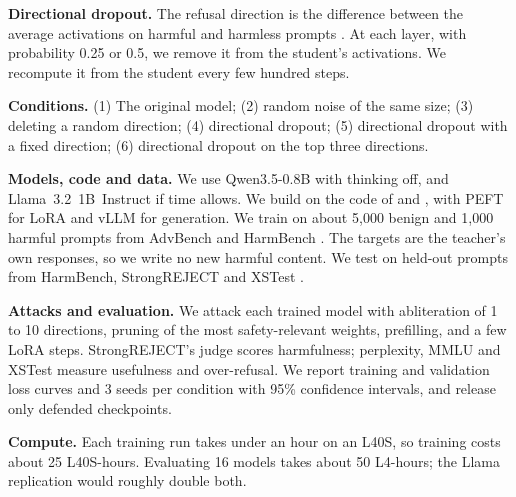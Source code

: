 \documentclass[12pt]{article}
\begin{document}
\textbf{Directional dropout.}
The refusal direction is the difference between the average activations on harmful and harmless prompts \citep{arditi2024refusal}.
At each layer, with probability 0.25 or 0.5, we remove it from the student's activations.
We recompute it from the student every few hundred steps.

\textbf{Conditions.}
(1) The original model; (2) random noise of the same size; (3) deleting a random direction; (4) directional dropout; (5) directional dropout with a fixed direction; (6) directional dropout on the top three directions.

\textbf{Models, code and data.}
We use Qwen3.5-0.8B with thinking off, and Llama~3.2~1B~Instruct if time allows.
We build on the code of \citet{arditi2024refusal} and \citet{wei2024brittleness}, with PEFT for LoRA and vLLM for generation.
We train on about 5{,}000 benign and 1{,}000 harmful prompts from AdvBench \citep{zou2023universal} and HarmBench \citep{mazeika2024harmbench}.
The targets are the teacher's own responses, so we write no new harmful content.
We test on held-out prompts from HarmBench, StrongREJECT \citep{souly2024strongreject} and XSTest \citep{rottger2024xstest}.

\textbf{Attacks and evaluation.}
We attack each trained model with abliteration of 1 to 10 directions, pruning of the most safety-relevant weights, prefilling, and a few LoRA steps.
StrongREJECT's judge scores harmfulness; perplexity, MMLU and XSTest measure usefulness and over-refusal.
We report training and validation loss curves and 3 seeds per condition with 95\% confidence intervals, and release only defended checkpoints.

\textbf{Compute.}
Each training run takes under an hour on an L40S, so training costs about 25 L40S-hours.
Evaluating 16 models takes about 50 L4-hours; the Llama replication would roughly double both.
\end{document}

